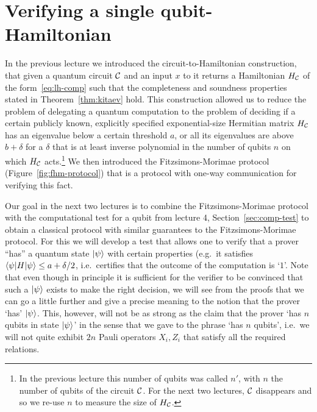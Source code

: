 \chapter{Verifying a single qubit-Hamiltonian}

In the previous lecture we introduced the circuit-to-Hamiltonian construction, that given a quantum circuit $\mathcal{C}$ and an input $x$ to it returns a Hamiltonian $H_{\mathcal{C}}$ of the form~\eqref{eq:lh-comp} such that the completeness and soundness properties stated in Theorem~\ref{thm:kitaev} hold. This construction allowed us to reduce the problem of delegating a quantum computation to the problem of deciding if a certain publicly known, explicitly specified exponential-size Hermitian matrix $H_{\mathcal{C}}$ has an eigenvalue below a certain threshold $a$, or all its eigenvalues are above $b+\delta$ for a $\delta$ that is at least inverse polynomial in the number of qubits $n$ on which $H_{\mathcal{C}}$ acts.\footnote{In the previous lecture this number of qubits was called $n'$, with $n$ the number of qubits of the circuit $\mathcal{C}$. For the next two lectures, $\mathcal{C}$ disappears and so we re-use $n$ to measure the size of $H_{\mathcal{C}}$.} We then introduced the Fitzsimons-Morimae protocol (Figure~\ref{fig:fhm-protocol}) that is a protocol with one-way communication for verifying this fact. 

Our goal in the next two lectures is to combine the Fitzsimons-Morimae protocol with the computational test for a qubit from lecture 4, Section~\ref{sec:comp-test} to obtain a classical protocol with similar guarantees to the Fitzsimons-Morimae protocol. For this we will develop a test that allows one to verify that a prover ``has'' a quantum state $|\psi\rangle$ with certain properties (e.g.\ it satisfies $\langle\psi|H|\psi\rangle \leq a + \delta/2$, i.e.\ certifies that the outcome of the computation is `$1$'. Note that even though in principle it is sufficient for the verifier to be convinced  that such a $|\psi\rangle$ exists to make the right decision, we will see from the proofs that we can go a little further and give a precise meaning to the notion that the prover `has' $|\psi\rangle$. This, however, will not be as strong as the claim that the prover `has $n$ qubits in state $|\psi\rangle$' in the sense that we gave to the phrase `has $n$ qubits', i.e.\ we will not quite exhibit $2n$ Pauli operators $X_i,Z_i$ that satisfy all the required relations. 


